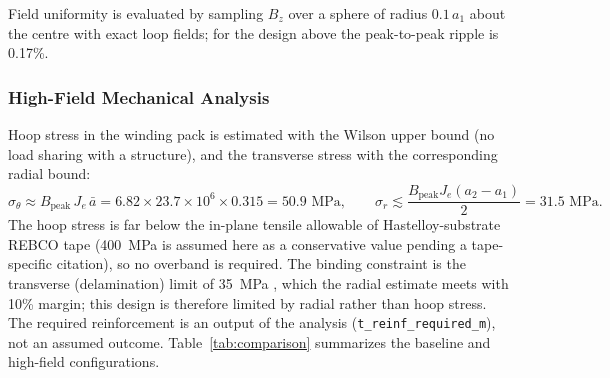 \documentclass[aps,prb,preprint,amsmath,amssymb]{revtex4-2}
\begin{document}
Field uniformity is evaluated by sampling $B_z$ over a sphere of radius $0.1\,a_1$ about the centre with exact loop fields; for the design above the peak-to-peak ripple is 0.17\%.

\subsubsection{High-Field Mechanical Analysis}

Hoop stress in the winding pack is estimated with the Wilson upper bound (no load sharing with a structure), and the transverse stress with the corresponding radial bound:
\begin{equation}
\sigma_{\theta} \approx B_{\text{peak}}\, J_e\, \bar a = 6.82 \times 23.7\times10^{6} \times 0.315 = 50.9 \text{ MPa}, \qquad
\sigma_r \lesssim \frac{B_{\text{peak}} J_e (a_2-a_1)}{2} = 31.5 \text{ MPa}.
\end{equation}
The hoop stress is far below the in-plane tensile allowable of Hastelloy-substrate REBCO tape (400~MPa is assumed here as a conservative value pending a tape-specific citation), so no overband is required. The binding constraint is the transverse (delamination) limit of 35~MPa \cite{vanderLaan2010mechanical}, which the radial estimate meets with 10\% margin; this design is therefore limited by radial rather than hoop stress. The required reinforcement is an output of the analysis (\texttt{t\_reinf\_required\_m}), not an assumed outcome. Table~\ref{tab:comparison} summarizes the baseline and high-field configurations.
\end{document}
